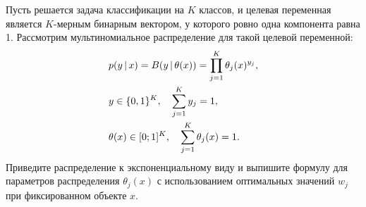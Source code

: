 \documentclass[12pt,a4paper]{article}
\begin{document}
    \begin{vkProblem}
        Пусть решается задача классификации на $K$ классов, и целевая переменная является $K$-мерным бинарным вектором, у которого ровно одна компонента равна 1. Рассмотрим мультиномиальное распределение для такой целевой переменной: \begin{align*}
            &p(y \mspace{3mu}{|}\mspace{3mu} x) = B(y \mspace{3mu}{|}\mspace{3mu} \theta(x)) = \prod_{j=1}^K \theta_j(x)^{y_j},\\
            &y \in \{0, 1\}^K, \quad \sum_{j=1}^K y_j = 1, \\
            &\theta(x) \in [0; 1]^K, \quad \sum_{j=1}^K \theta_j(x) = 1.
        \end{align*}
        Приведите распределение к экспоненциальному виду и выпишите формулу для параметров распределения $\theta_j(x)$ с использованием оптимальных значений $w_j$ при фиксированном объекте $x$.
    \end{vkProblem}
    
\end{document}
